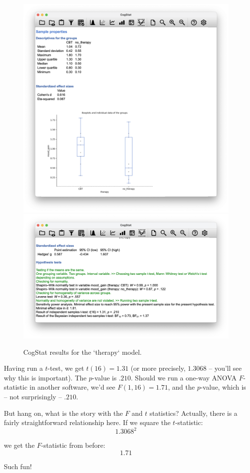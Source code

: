 \documentclass[
]{book}
\theoremstyle{definition}
\theoremstyle{definition}
\theoremstyle{definition}
\theoremstyle{definition}
\theoremstyle{remark}
\begin{document}
\begin{figure}

{\centering \includegraphics[width=0.66\linewidth]{resources/image/csmoodgaintherapybox} \includegraphics[width=0.66\linewidth]{resources/image/csmoodgaintherapyresult} 

}

\caption{CogStat results for the `therapy` model.}\label{fig:ttesttherapy}
\end{figure}

Having run a \(t\)-test, we get \(t(16) = 1.31\) (or more precisely, \(1.3068\) -- you'll see why this is important). The \(p\)-value is \(.210\). Should we run a one-way ANOVA \(F\)-statistic in another software, we'd see \(F(1,16) = 1.71\), and the \(p\)-value, which is -- not surprisingly -- \(.210\).

But hang on, what is the story with the \(F\) and \(t\) statistics? Actually, there is a fairly straightforward relationship here. If we square the \(t\)-statistic:
\[
1.3068 ^ 2
\]

we get the \(F\)-statistic from before:
\[
1.71
\]

Such fun!
\end{document}
